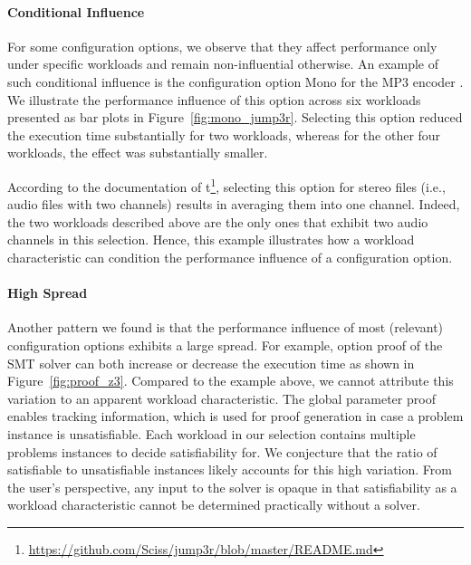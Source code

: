 {{{{\paragraph{Conditional Influence}\label{sec:conditional_influence} For some configuration options, we observe that they affect performance only under specific workloads and remain non-influential otherwise. An example of such conditional influence is the configuration option \textsf{Mono} for the MP3 encoder \jumper. We illustrate the performance influence of this option across six workloads presented as bar plots in Figure~\ref{fig:mono_jump3r}. Selecting this option reduced the execution time substantially for two workloads, whereas for the other four workloads, the effect was substantially smaller.

According to the documentation of t\jumper\footnote{\url{https://github.com/Sciss/jump3r/blob/master/README.md}}, selecting this option for stereo files (i.e., audio files with two channels) results in averaging them into one channel. Indeed, the two workloads described above are the only ones that exhibit two audio channels in this selection. Hence, this example illustrates how a workload  characteristic can condition the performance influence of a configuration option. 

\paragraph{High Spread} Another pattern we found is that the performance influence of most (relevant) configuration options exhibits a large spread. For example, option \textsf{proof} of the SMT solver \zdrei can both increase or decrease the execution time as shown in Figure~\ref{fig:proof_z3}. Compared to the example above, we cannot attribute this variation to an apparent workload characteristic.
The global parameter \textsf{proof} enables tracking information, which is used for proof generation in case a problem instance is unsatisfiable. Each workload in our selection contains multiple problems instances to decide satisfiability for. We conjecture that the ratio of satisfiable to unsatisfiable instances likely accounts for this high variation. From the user's perspective, any input to the solver is opaque in that satisfiability as a workload characteristic cannot be determined practically without a solver. 
}}}}
